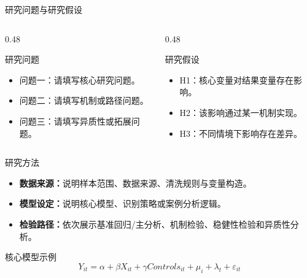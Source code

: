 \documentclass{beamer}
\begin{document}
\begin{frame}{研究问题与研究假设}
    \begin{columns}
        \begin{column}{0.48\textwidth}
            \begin{block}{研究问题}
                \begin{itemize}
                    \item 问题一：请填写核心研究问题。
                    \item 问题二：请填写机制或路径问题。
                    \item 问题三：请填写异质性或拓展问题。
                \end{itemize}
            \end{block}
        \end{column}
        \begin{column}{0.48\textwidth}
            \begin{block}{研究假设}
                \begin{itemize}
                    \item H1：核心变量对结果变量存在影响。
                    \item H2：该影响通过某一机制实现。
                    \item H3：不同情境下影响存在差异。
                \end{itemize}
            \end{block}
        \end{column}
    \end{columns}
\end{frame}

\begin{frame}{研究方法}
    \begin{itemize}
        \item \textbf{数据来源：}说明样本范围、数据来源、清洗规则与变量构造。
        \item \textbf{模型设定：}说明核心模型、识别策略或案例分析逻辑。
        \item \textbf{检验路径：}依次展示基准回归/主分析、机制检验、稳健性检验和异质性分析。
    \end{itemize}
    \begin{exampleblock}{核心模型示例}
        \begin{equation*}
            Y_{it}=\alpha+\beta X_{it}+\gamma Controls_{it}+\mu_i+\lambda_t+\varepsilon_{it}
        \end{equation*}
    \end{exampleblock}
\end{frame}
\end{document}
